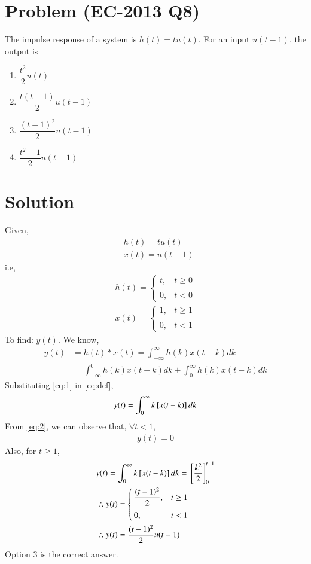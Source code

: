 \documentclass[journal,12pt,twocolumn]{IEEEtran}
\begin{document}
\section{Problem (EC-2013 Q8)}
The impulse response of a system is $h(t)=tu(t)$. For an input $u(t-1)$, the output is 
\begin{enumerate}
    \item $\dfrac{t^{2}}{2}u(t)$
    \item $\dfrac{t(t-1)}{2}u(t-1)$
    \item $\dfrac{(t-1)^{2}}{2}u(t-1)$
    \item $\dfrac{t^{2}-1}{2}u(t-1)$
\end{enumerate}
\section{Solution}
Given,
\begin{align}
    &h(t)=tu(t)\\
    &x(t)=u(t-1)
\end{align}
i.e,
\begin{align}
    \label{eq:1}
    h(t)=\begin{cases}
	t, & t \geq 0 \\~\\[-1em]
	0, & t <0
	\end{cases}\\
	\label{eq:2}
	x(t)=\begin{cases}
	1, & t \geq 1 \\~\\[-1em]
	0, & t <1
	\end{cases} 
\end{align}
To find: $y(t)$. We know, 
\begin{align}
y(t)&=h(t)*x(t)=\int_{-\infty}^{\infty}h(k)x(t-k)dk\\
&=\int_{-\infty}^{0}h(k)x(t-k)dk+\int_{0}^{\infty}h(k)x(t-k)dk
\label{eq:def}
\end{align}
Substituting \eqref{eq:1} in \eqref{eq:def}, 
\begin{align}
y(t)=\int_{0}^{\infty}k{}\left[x(t-k)\right]dk
\end{align}
From \eqref{eq:2}, we can observe that, $\forall t < 1$,
\begin{align}
y(t)=0 
\end{align}
Also, for $t \geq 1$,
\begin{align}
&y(t)=\int_{0}^{\infty}k{}\left[x(t-k)\right]dk={}\left[\dfrac{k^{2}}{2}\right]_{0}^{t-1}\\
&\therefore y(t)=\begin{cases}
	\dfrac{(t-1)^{2}}{2}, & t \geq 1 \\~\\[-1em]
	0, & t < 1
	\end{cases}\\ 
&\therefore y(t)=\dfrac{(t-1)^{2}}{2}u(t-1)
\end{align}
Option 3 is the correct answer.
\end{document}
